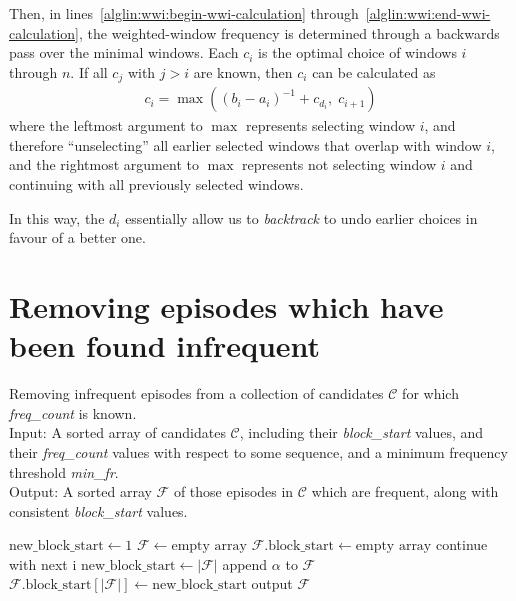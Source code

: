 Then, in lines~\ref{alglin:wwi:begin-wwi-calculation} through~\ref{alglin:wwi:end-wwi-calculation}, the weighted-window frequency is determined through a backwards pass over the minimal windows. Each $ c_i $ is the optimal choice of windows $ i $ through $ n $. If all $ c_j $ with $ j > i $ are known, then $ c_i $ can be calculated as
\begin{align*}
c_i = \max((b_i - a_i)^{-1} + c_{d_i}, \; c_{i+1})
\end{align*}
where the leftmost argument to $ \max $ represents selecting window $ i $, and therefore ``unselecting'' all earlier selected windows that overlap with window $ i $, and the rightmost argument to $ \max $ represents not selecting window $ i $ and continuing with all previously selected windows.

In this way, the $ d_i $ essentially allow us to \emph{backtrack} to undo earlier choices in favour of a better one.

\section{Removing episodes which have been found infrequent}
\label{sec:maintain-blocks}

\begin{algorithm}

\caption{Removing infrequent episodes from a collection of candidates $ \mathcal{C} $ for which \emph{freq\_count} is known. \\
Input: A sorted array of candidates $ \mathcal{C} $, including their \emph{block\_start} values, and their \emph{freq\_count} values with respect to some sequence, and a minimum frequency threshold \emph{min\_fr}. \\
Output: A sorted array $ \mathcal{F} $ of those episodes in $ \mathcal{C} $ which are frequent, along with consistent \emph{block\_start} values.
}

\begin{algorithmic}[1]

\State $ \text{new\_block\_start} \gets 1 $
\State $ \mathcal{F} \gets \text{empty array} $
\State $ \mathcal{F} \text{.block\_start} \gets \text{empty array} $
        \State continue with next i
    \EndIf
     \label{alglin:remove-infrequent-episodes:different-block-test}
        \State $ \text{new\_block\_start} \gets | \mathcal{F} | $
    \EndIf
    \State append $ \alpha $ to $ \mathcal{F} $
    \State $ \mathcal{F} \text{.block\_start}[ | \mathcal{F} | ] \gets \text{new\_block\_start} $
\EndFor
\State output $ \mathcal{F} $

\end{algorithmic}

\label{alg:remove-infrequent-episodes}
\end{algorithm}


